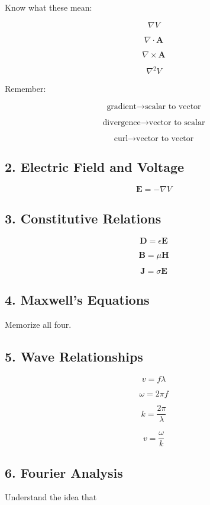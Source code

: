 \documentclass[11pt]{article}
\newcommand{\vect}[1]{\mathbf{#1}}
\begin{document}
Know what these mean:

\[
\boxed{
\nabla V
}
\]

\[
\boxed{
\nabla\cdot\vect{A}
}
\]

\[
\boxed{
\nabla\times\vect{A}
}
\]

\[
\boxed{
\nabla^2V
}
\]

Remember:

\[
\boxed{
\text{gradient}
\rightarrow
\text{scalar to vector}
}
\]

\[
\boxed{
\text{divergence}
\rightarrow
\text{vector to scalar}
}
\]

\[
\boxed{
\text{curl}
\rightarrow
\text{vector to vector}
}
\]

\subsection*{2. Electric Field and Voltage}

\[
\boxed{
\vect{E}
=
-\nabla V
}
\]

\subsection*{3. Constitutive Relations}

\[
\boxed{
\vect{D}=\epsilon\vect{E}
}
\]

\[
\boxed{
\vect{B}=\mu\vect{H}
}
\]

\[
\boxed{
\vect{J}=\sigma\vect{E}
}
\]

\subsection*{4. Maxwell's Equations}

Memorize all four.

\subsection*{5. Wave Relationships}

\[
\boxed{
v=f\lambda
}
\]

\[
\boxed{
\omega=2\pi f
}
\]

\[
\boxed{
k=\frac{2\pi}{\lambda}
}
\]

\[
\boxed{
v=\frac{\omega}{k}
}
\]

\subsection*{6. Fourier Analysis}

Understand the idea that
\end{document}
